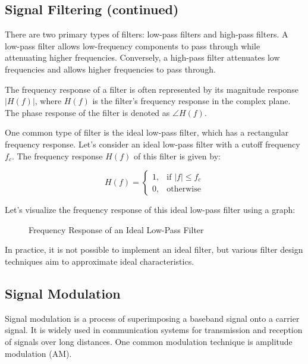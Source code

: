 \documentclass{article}
\begin{document}
\subsection{Signal Filtering (continued)}
There are two primary types of filters: low-pass filters and high-pass filters. A low-pass filter allows low-frequency components to pass through while attenuating higher frequencies. Conversely, a high-pass filter attenuates low frequencies and allows higher frequencies to pass through.

The frequency response of a filter is often represented by its magnitude response $|H(f)|$, where $H(f)$ is the filter's frequency response in the complex plane. The phase response of the filter is denoted as $\angle H(f)$.

One common type of filter is the ideal low-pass filter, which has a rectangular frequency response. Let's consider an ideal low-pass filter with a cutoff frequency $f_c$. The frequency response $H(f)$ of this filter is given by:

\begin{equation}
H(f) = \begin{cases}
    1, & \text{if } |f| \leq f_c \\
    0, & \text{otherwise}
\end{cases}
\end{equation}

Let's visualize the frequency response of this ideal low-pass filter using a graph:

\begin{figure}[H]
    \centering
    \caption{Frequency Response of an Ideal Low-Pass Filter}
\end{figure}

In practice, it is not possible to implement an ideal filter, but various filter design techniques aim to approximate ideal characteristics.

\subsection{Signal Modulation}
Signal modulation is a process of superimposing a baseband signal onto a carrier signal. It is widely used in communication systems for transmission and reception of signals over long distances. One common modulation technique is amplitude modulation (AM).
\end{document}
